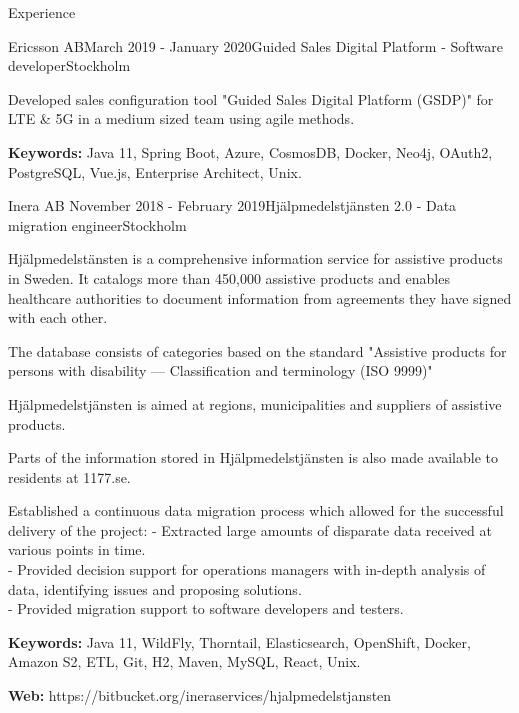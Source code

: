 \documentclass{resume}
\begin{document}
\begin{rSection}{Experience}
    \begin{rSubsection}{Ericsson AB}{March 2019 - January 2020}{Guided Sales Digital Platform - Software developer}{Stockholm}
      \item Developed sales configuration tool "Guided Sales Digital Platform (GSDP)" for LTE \& 5G in a medium sized team using agile methods.
      \item \textbf{Keywords:} Java 11, Spring Boot, Azure, CosmosDB, Docker, Neo4j, OAuth2, PostgreSQL, Vue.js, Enterprise Architect, Unix.
    \end{rSubsection}

    \begin{rSubsection}{Inera AB }{November 2018 - February 2019}{Hjälpmedelstjänsten 2.0 - Data migration engineer}{Stockholm}
      \item Hjälpmedelstänsten is a comprehensive information service for assistive products in Sweden.
      It catalogs more than 450,000 assistive products and enables healthcare authorities to document
      information from agreements they have signed with each other.
      \item The database consists of categories based on the standard "Assistive products for persons with disability — Classification and terminology (ISO 9999)"
      \item Hjälpmedelstjänsten is aimed at regions, municipalities and suppliers of assistive products.
      \item Parts of the information stored in Hjälpmedelstjänsten is also made available to residents at 1177.se.
      \item Established a continuous data migration process which allowed for the successful delivery of the project:
       - Extracted large amounts of disparate data received at various points in time. \\
       - Provided decision support for operations managers with in-depth analysis of data, identifying issues and proposing solutions. \\
       - Provided migration support to software developers and testers.
      \item \textbf{Keywords:} Java 11, WildFly, Thorntail, Elasticsearch, OpenShift, Docker, Amazon S2, ETL, Git, H2, Maven, MySQL, React, Unix.
      \item \textbf{Web:} https://bitbucket.org/ineraservices/hjalpmedelstjansten
    \end{rSubsection}


\end{rSection}
\end{document}
